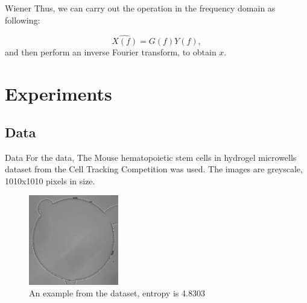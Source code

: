 \documentclass[aspectratio=1610]{beamer}
\begin{document}
\begin{frame}{Wiener}
  Thus, we can carry out the operation in the frequency domain as following:
  
  $$
  \hat{X(f)} = G(f)Y(f),
  $$
  and then perform an inverse Fourier transform, to obtain $x$.
\end{frame}

\section {Experiments}

\begin{frame}
  \tableofcontents[currentsection, subsectionstyle=show/show/hide]
\end{frame}

\subsection {Data}
\begin{frame}{Data}
  For the data, The Mouse hematopoietic stem cells in hydrogel microwells dataset from 
  the Cell Tracking Competition was used. The images are greyscale, 1010x1010 
  pixels in size.
  \begin{figure}
    \centering
    \includegraphics[width=0.35\textwidth]{images/cell.png}
    \caption{An example from the dataset, entropy is 4.8303}
    \label{fig:cell}
  \end{figure}
\end{frame}
\end{document}
